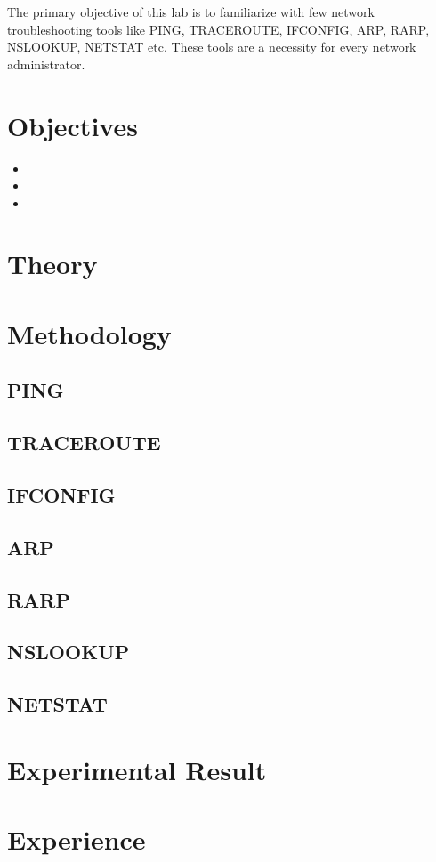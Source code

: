 \documentclass[11pt]{article}
\begin{document}
The primary objective of this lab is to familiarize with few network troubleshooting tools like PING, TRACEROUTE, IFCONFIG, ARP, RARP, NSLOOKUP, NETSTAT etc. These tools are a necessity for every network administrator.

\section{Objectives}
\begin{itemize}
    \item
    \item
    \item
\end{itemize}
\section{Theory}



\section{Methodology}

\subsection{PING}
\subsection{TRACEROUTE}
\subsection{IFCONFIG}
\subsection{ARP}
\subsection{RARP}
\subsection{NSLOOKUP}
\subsection{NETSTAT}

\section{Experimental Result}

\section{Experience}

\end{document}
